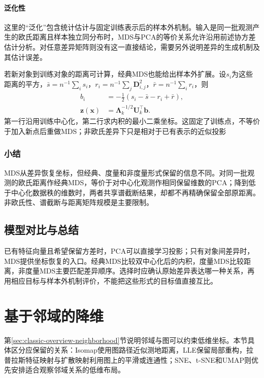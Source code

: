 \paragraph{泛化性}

这里的“泛化”包含统计估计与固定训练表示后的样本外机制。输入是同一批观测产生的欧氏距离且样本独立同分布时，MDS与PCA的等价关系允许沿用前述协方差估计分析。对任意差异矩阵则没有这一直接结论，需要另外说明差异的生成机制及其估计误差。

若新对象到训练对象的距离可计算，经典MDS也能给出样本外扩展。设$s_i$为这些距离的平方，$\bar s=n^{-1}\sum_i s_i$，$r_i=n^{-1}\sum_j\bm{D}_{i,j}^2$，$\bar r=n^{-1}\sum_i r_i$，则
\begin{equation}
  \label{eq:dim-mds-extension}
  \begin{aligned}
    b_i&=-\frac12(s_i-\bar s-r_i+\bar r),\\
    \bm{z}(\bm{x})
      &=\bm{\Lambda}_k^{-1/2}\bm{U}_k^{\top}\bm{b}.
  \end{aligned}
\end{equation}
第一行沿用训练中心化，第二行求内积的最小二乘坐标。这固定了训练点，不等价于加入新点后重做MDS；非欧氏差异下只是相对于已有表示的近似投影

\subsubsection{小结}

MDS从差异恢复坐标，但经典、度量和非度量形式保留的信息不同。对同一批观测的欧氏距离作经典MDS，等价于对中心化观测作相同保留维数的PCA；降到低于中心化数据秩的维数时，两者共享谱截断结果，却都不再精确保留全部原距离。非欧氏性、谱截断与距离矩阵规模是主要限制。

\subsection{模型对比与总结}

已有特征向量且希望保留方差时，PCA可以直接学习投影；只有对象间差异时，MDS提供坐标恢复的入口。经典MDS比较双中心化后的内积，度量MDS比较距离，非度量MDS主要匹配差异顺序。选择时应确认原始差异表达哪一种关系，再用相应目标与样本外机制评价，不能把这些形式的目标值直接互比。

\section{基于邻域的降维}
\label{sec:dim-neighbors}
\label{sec:dim-manifold}

第\ref{sec:classic-overview-neighborhood}节说明邻域与图可以约束低维坐标。本节具体区分应保留的关系：Isomap使用图路径近似测地距离，LLE保留局部重构，拉普拉斯特征映射与扩散映射利用图上的平滑或连通性；SNE、t-SNE和UMAP则优先安排适合观察邻域关系的低维布局。


